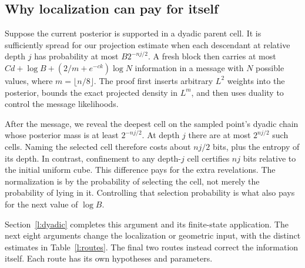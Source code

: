 \subsection{Why localization can pay for itself}

Suppose the current posterior is supported in a dyadic parent cell.
It is sufficiently spread for our projection estimate when each
descendant at relative depth \(j\) has probability at most
\(B2^{-nj/2}\). A fresh block then carries at most
\(Cd+\log B+(2/m+e^{-ck})\log N\) information in a message
with \(N\) possible values, where \(m=\lfloor n/8\rfloor\).
The proof first inserts arbitrary \(L^2\) weights into the
posterior, bounds the exact projected density in \(L^m\), and
then uses duality to control the message likelihoods.

After the message, we reveal the deepest cell on the sampled point's
dyadic chain whose posterior mass is at least \(2^{-nj/2}\).
At depth \(j\) there are at most \(2^{nj/2}\) such cells.
Naming the selected cell therefore costs about \(nj/2\) bits,
plus the entropy of its depth. In contrast, confinement to any
depth-\(j\) cell certifies \(nj\) bits relative to the initial
uniform cube. This difference pays for the extra revelations.
The normalization is by the probability of selecting the cell,
not merely the probability of lying in it. Controlling that
selection probability is what also pays for the next value of
\(\log B\).

Section~\ref{l:dyadic} completes this argument and its finite-state
application. The next eight arguments change the localization or
geometric input, with the distinct estimates in Table~\ref{l:routes}.
The final two routes instead correct the information itself. Each
route has its own hypotheses and parameters.

